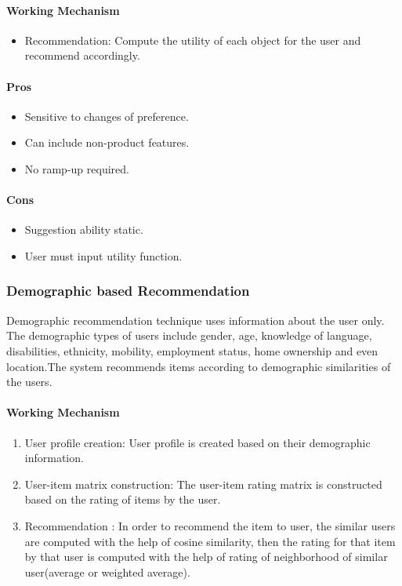 \paragraph{Working Mechanism}\hfill
\begin{itemize}
	\item Recommendation: Compute the utility of each object for the user and recommend accordingly.
\end{itemize}
\paragraph{Pros}\hfill

\begin{itemize}
	\item Sensitive to changes of preference.
	\item Can include non-product features.
	\item No ramp-up required.
\end{itemize}
\paragraph{Cons}\hfill

\begin{itemize}
	\item Suggestion ability static.
	\item User must input utility function.
\end{itemize}

\subsubsection{Demographic based Recommendation}
Demographic recommendation technique \cite{demographic} uses information about the user only. The demographic types of users include gender, age, knowledge of language, disabilities, ethnicity, mobility, employment status, home  ownership and even location.The system recommends items according to demographic similarities of the users.
\paragraph{Working Mechanism}\hfill
\begin{enumerate}
	\item User profile creation: User profile is created based on their demographic information.
	\item User-item matrix construction: The user-item rating matrix is constructed based on the rating of items by the user.
	\item Recommendation : In order to recommend the item to user, the similar users are computed with the help of cosine similarity, then the rating for that item by that user is computed with the help of rating of neighborhood of similar user(average or weighted average).
\end{enumerate}
